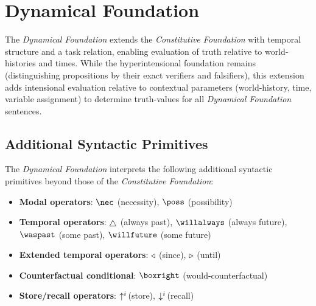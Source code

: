 \documentclass[../LogosReference.tex]{subfiles}
\begin{document}

\section{Dynamical Foundation}\label{sec:dynamical-foundation}

The \textit{Dynamical Foundation} extends the \textit{Constitutive Foundation} with temporal structure and a task relation, enabling evaluation of truth relative to world-histories and times.
While the hyperintensional foundation remains (distinguishing propositions by their exact verifiers and falsifiers), this extension adds intensional evaluation relative to contextual parameters (world-history, time, variable assignment) to determine truth-values for all \textit{Dynamical Foundation} sentences.


\subsection{Additional Syntactic Primitives}\label{sec:additional-syntax}

The \textit{Dynamical Foundation} interprets the following additional syntactic primitives beyond those of the \textit{Constitutive Foundation}:

\begin{itemize}
	\item \textbf{Modal operators}: $\nec$ (necessity), $\poss$ (possibility)
	\item \textbf{Temporal operators}: $\always$ (always past), $\willalways$ (always future), $\waspast$ (some past), $\willfuture$ (some future)
	\item \textbf{Extended temporal operators}: $\triangleleft$ (since), $\triangleright$ (until)
	\item \textbf{Counterfactual conditional}: $\boxright$ (would-counterfactual)
	\item \textbf{Store/recall operators}: $\uparrow^{i}\hspace{-2pt}$ (store), $\downarrow^{i}\hspace{-2pt}$ (recall)
\end{itemize}

\end{document}
